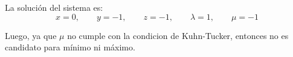 \begin{enumerate}
\begin{enumerate}[\bfseries a)]
\begin{enumerate}[1.]
			La solución del sistema es:
			$$x=0,\qquad y=-1,\qquad z=-1,\qquad \lambda=1,\qquad \mu=-1$$

			Luego, ya que $\mu$ no cumple con la condicion de Kuhn-Tucker, entonces no es candidato para mínimo ni máximo.

		\end{enumerate}

	\end{enumerate}

\end{enumerate}





